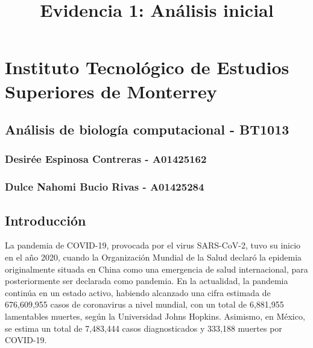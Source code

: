 \documentclass[
]{article}
\title{Evidencia 1: Análisis inicial}
\author{}
\date{\vspace{-2.5em}}
\begin{document}
\maketitle

{
\setcounter{tocdepth}{2}
\tableofcontents
}
\hypertarget{instituto-tecnoluxf3gico-de-estudios-superiores-de-monterrey}{%
\section{Instituto Tecnológico de Estudios Superiores de
Monterrey}\label{instituto-tecnoluxf3gico-de-estudios-superiores-de-monterrey}}

\hypertarget{anuxe1lisis-de-biologuxeda-computacional---bt1013}{%
\subsection{Análisis de biología computacional -
BT1013}\label{anuxe1lisis-de-biologuxeda-computacional---bt1013}}

\hypertarget{desiruxe9e-espinosa-contreras---a01425162}{%
\subsubsection{Desirée Espinosa Contreras -
A01425162}\label{desiruxe9e-espinosa-contreras---a01425162}}

\hypertarget{dulce-nahomi-bucio-rivas---a01425284}{%
\subsubsection{Dulce Nahomi Bucio Rivas -
A01425284}\label{dulce-nahomi-bucio-rivas---a01425284}}

\hypertarget{introducciuxf3n}{%
\subsection{Introducción}\label{introducciuxf3n}}

La pandemia de COVID-19, provocada por el virus SARS-CoV-2, tuvo su
inicio en el año 2020, cuando la Organización Mundial de la Salud
declaró la epidemia originalmente situada en China como una emergencia
de salud internacional, para posteriormente ser declarada como pandemia.
En la actualidad, la pandemia continúa en un estado activo, habiendo
alcanzado una cifra estimada de 676,609,955 casos de coronavirus a nivel
mundial, con un total de 6,881,955 lamentables muertes, según la
Universidad Johns Hopkins. Asimismo, en México, se estima un total de
7,483,444 casos diagnosticados y 333,188 muertes por COVID-19.
\end{document}
